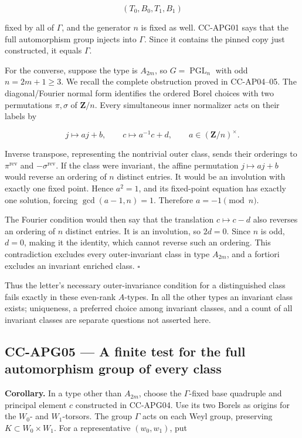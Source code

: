 \[
 (T_0,B_0,T_1,B_1)
\]

fixed by all of \(\Gamma\), and the generator \(n\) is fixed as well.
CC-APG01 says that the full automorphism group injects into \(\Gamma\).
Since it contains the pinned copy just constructed, it equals
\(\Gamma\).

For the converse, suppose the type is \(A_{2m}\), so
\(G=\operatorname{PGL}_n\) with odd \(n=2m+1\geq3\). We recall the
complete obstruction proved in CC-AP04--05. The diagonal/Fourier normal
form identifies the ordered Borel choices with two permutations
\(\pi,\sigma\) of \(\mathbf Z/n\). Every simultaneous inner normalizer
acts on their labels by

\[
 j\longmapsto aj+b,\qquad
 c\longmapsto a^{-1}c+d,\qquad a\in(\mathbf Z/n)^\times.
\]

Inverse transpose, representing the nontrivial outer class, sends their
orderings to \(\pi^{\mathrm{rev}}\) and \(-\sigma^{\mathrm{rev}}\). If
the class were invariant, the affine permutation \(j\mapsto aj+b\) would
reverse an ordering of \(n\) distinct entries. It would be an involution
with exactly one fixed point. Hence \(a^2=1\), and its fixed-point
equation has exactly one solution, forcing \(\gcd(a-1,n)=1\). Therefore
\(a=-1\pmod n\).

The Fourier condition would then say that the translation
\(c\mapsto c-d\) also reverses an ordering of \(n\) distinct entries. It
is an involution, so \(2d=0\). Since \(n\) is odd, \(d=0\), making it
the identity, which cannot reverse such an ordering. This contradiction
excludes every outer-invariant class in type \(A_{2m}\), and a fortiori
excludes an invariant enriched class. \(\square\)

Thus the letter's necessary outer-invariance condition for a
distinguished class fails exactly in these even-rank \(A\)-types. In all
the other types an invariant class exists; uniqueness, a preferred
choice among invariant classes, and a count of all invariant classes are
separate questions not asserted here.

\subsection{CC-APG05 --- A finite test for the full automorphism group
of every
class}\label{cc-apg05-a-finite-test-for-the-full-automorphism-group-of-every-class}

\textbf{Corollary.} In a type other than \(A_{2m}\), choose the
\(\Gamma\)-fixed base quadruple and principal element \(c\) constructed
in CC-APG04. Use its two Borels as origins for the \(W_0\)- and
\(W_1\)-torsors. The group \(\Gamma\) acts on each Weyl group,
preserving \(K\subset W_0\times W_1\). For a representative
\((w_0,w_1)\), put

